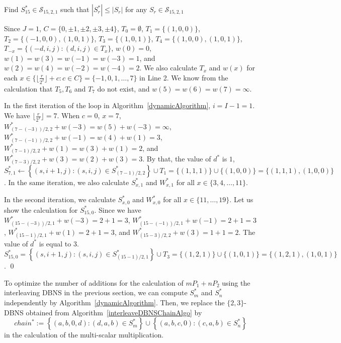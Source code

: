 \begin{example} Find $S^*_{15} \in \mathcal{S}_{15, 2, 1}$ such that $|S^*_r| \leq |S_r|$ for any $S_r \in \mathcal{S}_{15, 2, 1}$

Since $J = 1$,
$C = \{0, \pm 1, \pm 2, \pm 3, \pm 4\}$,
$T_0 = \emptyset$,
$T_1 = \{(1,0,0)\}$,
$T_2 =\{(-1,0,0), (1,0,1)\}$,
$T_3 = \{(1,0,1)\}$,
$T_4 = \{(1,0,0),(1,0,1)\}$,
$T_{-x} = \{(-d, i, j) : (d, i, j) \in T_x\}$,
$w(0) = 0$,
$w(1) = w(3) = w(-1) = w(-3) = 1$, and
$w(2) = w(4) = w(-2) = w(-4) = 2$.
We also calculate $T_x$ and $w(x)$ for each $x \in \{ \lfloor \frac{r}{2^I} \rfloor + c : c \in C \} = \{ -1, 0, 1, \dots, 7 \}$ in Line 2.
We know from the calculation that $T_5, T_6$ and $T_7$ do not exist, and $w(5) = w(6) = w(7) = \infty$.

In the first iteration of the loop in Algorithm~\ref{dynamicAlgorithm}, $i = I - 1 = 1$.
We have $\lfloor \frac{r}{2^1} \rfloor = 7$.
When $c = 0$,
$x = 7$, 
$W^*_{(7 - (-3)) / 2,2} + w(-3) = w(5) + w(-3) = \infty$,
$W^*_{(7 - (-1)) / 2,2} + w(-1) = w(4) + w(1) = 3$,
$W^*_{(7 - 1) / 2,2} + w(1) = w(3) + w(1) = 2$, and
$W^*_{(7-3)/2, 2} + w(3) = w(2) + w(3) = 3$.
By that, the value of $d^*$ is $1$,
$S^*_{7, 1} \leftarrow \left\{(s,i+1,j) : (s,i,j) \in S^*_{(7-1) / 2, 2}\right\} \cup T_1 = \{ (1,1,1) \} \cup \{ (1,0,0)\} = \{ (1,1,1), (1,0,0) \}$.
In the same iteration, we also calculate $S^*_{x,1}$ and $W^*_{x,1}$ for all $x \in \{ 3, 4, \dots, 11 \}$.

In the second iteration, we calculate $S^*_{x,0}$ and $W^*_{x,0}$ for all $x \in \{ 11, \dots, 19 \}$.
Let us show the calculation for $S^*_{15,0}$.
Since we have $W^*_{(15 - (-3)) / 2,1} + w(-3) = 2 + 1 = 3$,
$W^*_{(15 - (-1)) / 2,1} + w(-1) = 2 + 1 = 3$, $W^*_{(15 - 1) / 2,1} + w(1) = 2 + 1 = 3$, and
$W^*_{(15-3)/2, 2} + w(3) = 1 + 1 = 2$.
The value of $d^*$ is equal to $3$.
$S^*_{15,0} = \left\{(s,i+1,j) : (s,i,j) \in S^*_{(15-1) / 2, 1}\right\} \cup T_3 = \{(1,2,1)\} \cup \{(1,0,1)\} = \{(1,2,1), (1,0,1)\}$. \qed
\end{example}

To optimize the number of additions for the calculation of $mP_1 + nP_2$ using the interleaving DBNS in the previous section,
we can compute $S_m^*$ and $S_n^*$ independently by Algorithm~\ref{dynamicAlgorithm}.
Then, we replace the $\{2,3\}$-DBNS obtained from Algorithm~\ref{interleaveDBNSChainAlgo} by
$$chain^* := \left\{ (a,b,0,d) : (d, a, b) \in S_m^* \right\} \cup \left\{ (a,b,c,0) : (c, a, b) \in S_n^* \right\}$$
in the calculation of the multi-scalar multiplication.

